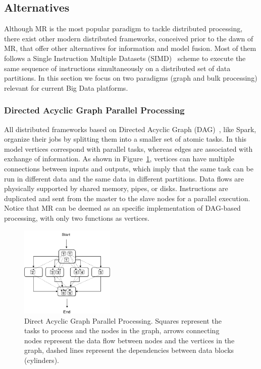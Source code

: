 \documentclass[3p,review]{elsarticle}
\begin{document}


\subsection{Alternatives}\label{subsec:altMR}

Although MR is the most popular paradigm to tackle distributed processing, there exist other modern distributed frameworks, conceived prior to the dawn of MR, that offer other alternatives for information and model fusion. Most of them follows a Single Instruction Multiple Datasets (SIMD)~\cite{sung00} scheme to execute the same sequence of instructions simultaneously on a distributed set of data partitions. In this section we focus on two paradigms (graph and bulk processing) relevant for current Big Data platforms.

\subsubsection{Directed Acyclic Graph Parallel Processing}

All distributed frameworks based on Directed Acyclic Graph (DAG)~\cite{dennis74}, like Spark, organize their jobs by splitting them into a smaller set of atomic tasks. In this model vertices correspond with parallel tasks, whereas edges are associated with exchange of information. As shown in Figure~\ref{fig:dag}, vertices can have multiple connections between inputs and outputs, which imply that the same task can be run in different data and the same data in different partitions. Data flows are physically supported by shared memory, pipes, or disks. Instructions are duplicated and sent from the master to the slave nodes for a parallel execution. Notice that MR can be deemed as an specific implementation of DAG-based processing, with only two functions as vertices. 

\begin{figure}[htp]
    \centering
    \includegraphics[width=0.4\textwidth]{dag}
    \caption{Direct Acyclic Graph Parallel Processing. Squares represent the tasks to process and the nodes in the graph, arrows connecting nodes represent the data flow between nodes and the vertices in the graph, dashed lines represent the dependencies between data blocks (cylinders).}
    \label{fig:dag}
\end{figure}
\end{document}
